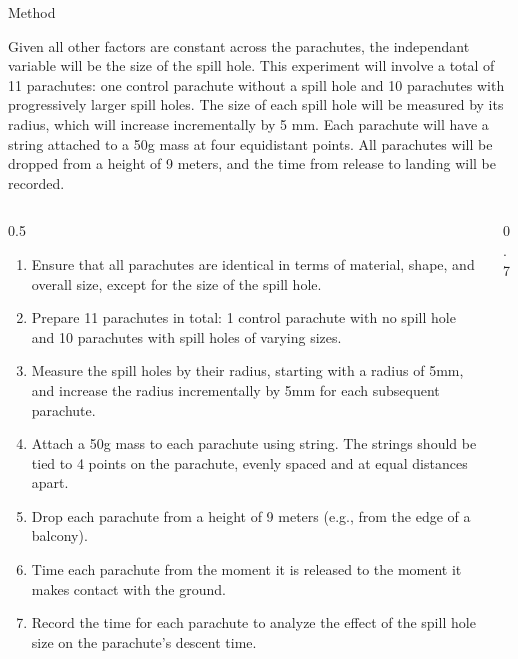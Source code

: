 \documentclass[final]{beamer}
\newlength{\colwidth}
\begin{document}
\begin{frame}[t]
\begin{columns}[t]
\begin{column}{\colwidth}
\begin{block}{Method}
\begin{itemize}
    \end{itemize}

Given all other factors are constant across the parachutes, the independant variable will be the size of the spill hole. This experiment will involve a total of 11 parachutes: one control parachute without a spill hole and 10 parachutes with progressively larger spill holes. The size of each spill hole will be measured by its radius, which will increase incrementally by 5 mm. Each parachute will have a string attached to a 50g mass at four equidistant points. All parachutes will be dropped from a height of 9 meters, and the time from release to landing will be recorded.
\begin{columns}[t]
\hspace{20pt} %
\begin{column}{0.5\colwidth}
\vspace{-20pt}
\begin{enumerate}
    \item Ensure that all parachutes are identical in terms of material, shape, and overall size, except for the size of the spill hole.
    
    \item Prepare 11 parachutes in total: 1 control parachute with no spill hole and 10 parachutes with spill holes of varying sizes.


    \item Measure the spill holes by their radius, starting with a radius of 5mm, and increase the radius incrementally by 5mm for each subsequent parachute.

    \item Attach a 50g mass to each parachute using string. The strings should be tied to 4 points on the parachute, evenly spaced and at equal distances apart.

    \item Drop each parachute from a height of 9 meters (e.g., from the edge of a balcony).
    
    \item Time each parachute from the moment it is released to the moment it makes contact with the ground.

    \item Record the time for each parachute to analyze the effect of the spill hole size on the parachute's descent time.
\end{enumerate}
\end{column}
\begin{column}{0.7\colwidth}
\vspace{70pt}


\end{column}
\end{columns}
\end{block}
\end{column}
\end{columns}
\end{frame}
\end{document}

